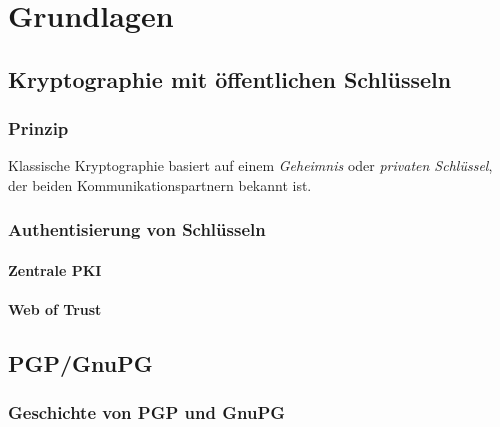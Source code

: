 
\chapter{Grundlagen}
\label{ch:Grundlagen}

\section{Kryptographie mit öffentlichen Schlüsseln}
\label{ch:Grundlagen:sec:PublicKeyCrypto}

\subsection{Prinzip}
\label{ch:Grundlagen:sec:PublicKeyCrypto:subsec:Prinzip}

Klassische Kryptographie basiert auf einem \emph{Geheimnis} oder
\emph{privaten Schl\"ussel}, der beiden Kommunikationspartnern bekannt
ist. 

\subsection{Authentisierung von Schlüsseln}
\label{ch:Grundlagen:sec:PublicKeyCrypto:subsec:KeyAuth}

\subsubsection{Zentrale PKI}
\label{ch:Grundlagen:sec:PublicKeyCrypto:subsec:KeyAuth:subsubsec:PKI}

\subsubsection{Web of Trust}
\label{ch:Grundlagen:sec:PublicKeyCrypto:subsec:KeyAuth:subsubsec:WOT}

\section{PGP/GnuPG}
\label{ch:Grundlagen:sec:PGP}

\subsection{Geschichte von PGP und GnuPG}
\label{ch:Grundlagen:sec:PGP:subsec:Geschichte}

